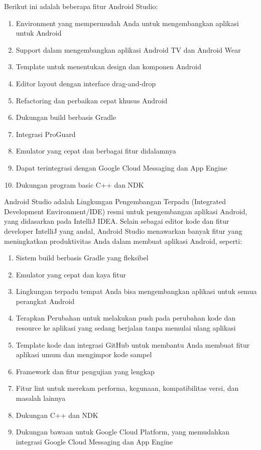 Berikut ini adalah beberapa fitur Android Studio:
\begin{enumerate}
    \item Environment yang mempermudah Anda untuk mengembangkan aplikasi untuk Android
    \item Support dalam mengembangkan aplikasi Android TV dan Android Wear
    \item Template untuk menentukan design dan komponen Android
    \item Editor layout dengan interface drag-and-drop
    \item Refactoring dan perbaikan cepat khusus Android
    \item Dukungan build berbasis Gradle
    \item Integrasi ProGuard
    \item Emulator yang cepat dan berbagai fitur didalamnya
    \item Dapat terintegrasi dengan Google Cloud Messaging dan App Engine
    \item Dukungan program basic C++ dan NDK
\end{enumerate}

Android Studio adalah Lingkungan Pengembangan Terpadu (Integrated Development Environment/IDE) resmi untuk pengembangan aplikasi Android, yang didasarkan pada IntelliJ IDEA. Selain sebagai editor kode dan fitur developer IntelliJ yang andal, Android Studio menawarkan banyak fitur yang meningkatkan produktivitas Anda dalam membuat aplikasi Android, seperti:
\begin{enumerate}
    \item Sistem build berbasis Gradle yang fleksibel
    \item Emulator yang cepat dan kaya fitur
    \item Lingkungan terpadu tempat Anda bisa mengembangkan aplikasi untuk semua perangkat Android
    \item Terapkan Perubahan untuk melakukan push pada perubahan kode dan resource ke aplikasi yang sedang berjalan tanpa memulai ulang aplikasi
    \item Template kode dan integrasi GitHub untuk membantu Anda membuat fitur aplikasi umum dan mengimpor kode sampel
    \item Framework dan fitur pengujian yang lengkap
    \item Fitur lint untuk merekam performa, kegunaan, kompatibilitas versi, dan masalah lainnya
    \item Dukungan C++ dan NDK
    \item Dukungan bawaan untuk Google Cloud Platform, yang memudahkan integrasi Google Cloud Messaging dan App Engine
\end{enumerate}

